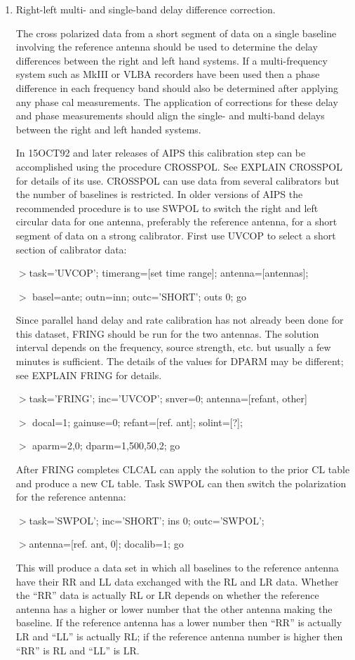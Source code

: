 \begin{enumerate}
\item Right-left multi- and single-band delay difference correction.

  The cross polarized data from a short segment of data on a single
baseline involving the reference antenna should be used to determine
the delay differences between the right and left hand systems.  If a
multi-frequency system such as MkIII or VLBA recorders have been used
then a phase difference in each frequency band should also be
determined after applying any phase cal measurements.  The application
of corrections for these delay and phase measurements should align the
single- and multi-band delays between the right and left handed
systems.

   In 15OCT92 and later releases of AIPS this calibration step can be
accomplished using the procedure CROSSPOL.  See EXPLAIN CROSSPOL for
details of its use.  CROSSPOL can use data from several calibrators
but the number of baselines is restricted.  In older versions of AIPS
the recommended procedure is to use SWPOL to switch the right and left
circular data for one antenna, preferably the reference antenna, for a
short segment of data on a strong calibrator.  First use UVCOP to
select a short section of calibrator data:
\par\noindent
$>$task='UVCOP'; timerang=[set time range]; antenna=[antennas];
\par\noindent
$>$  basel=ante; outn=inn; outc='SHORT'; outs 0; go

   Since parallel hand delay and rate calibration has not already been
done for this dataset,  FRING should be run for the two antennas.
The solution interval depends on the
frequency, source strength, etc. but usually a few minutes is
sufficient.  The details of the values for DPARM may be different; see
EXPLAIN FRING for details.
\par\noindent
$>$task='FRING'; inc='UVCOP'; snver=0; antenna=[refant, other]
\par\noindent
$>$ docal=1; gainuse=0; refant=[ref. ant]; solint=[?];
\par\noindent
$>$ aparm=2,0; dparm=1,500,50,2; go

   After FRING completes CLCAL can apply the solution to the prior CL
table and produce a new CL table.  Task SWPOL can then switch the
polarization for the reference antenna:
\par\noindent
$>$task='SWPOL'; inc='SHORT'; ins 0; outc='SWPOL';
\par\noindent
$>$antenna=[ref. ant, 0]; docalib=1; go
\par\noindent
This will produce a data set in which all baselines to the reference
antenna have their RR and LL data exchanged with the RL and LR data.
Whether the ``RR'' data is actually RL or LR depends on whether the
reference antenna has a higher or lower number that the other antenna
making the baseline.  If the reference antenna has a lower number then
``RR'' is actually LR and ``LL'' is actually RL; if the reference
antenna number is higher then ``RR'' is RL and ``LL'' is LR.


\end{enumerate}
